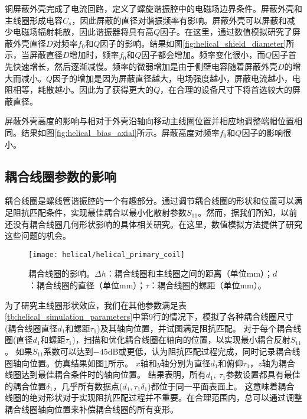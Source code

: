 铜屏蔽外壳完成了电流回路，定义了螺旋谐振腔中的电磁场边界条件。屏蔽外壳和主线圈形成电容$C_s$，因此屏蔽的直径对谐振频率有影响。屏蔽外壳可以屏蔽和减少电磁场辐射耗散，因此谐振器将具有高$Q$因子。在这里，通过数值模拟研究了屏蔽外壳直径$ D $对频率$f_0$和$ Q $因子的影响。结果如图\ref{fig:helical_shield_diameter}所示，当屏蔽直径$ D $增加时，频率$f_0$和$ Q $因子都会增加。频率变化很小，而$ Q $因子首先快速增长，然后逐渐减慢。频率的微弱增加是由于侧壁电容随着屏蔽外壳$D$的增大而减小。$Q$因子的增加是因为屏蔽直径越大，电场强度越小，屏蔽电流越小，电阻相等，耗散越小。因此为了获得更大的$Q$，在合理的设备尺寸下将首选较大的屏蔽直径。

屏蔽外壳高度的影响与相对于外壳沿轴向移动主线圈位置并相应地调整端帽位置相同。结果如图\ref{fig:helical_bias_axial}所示。屏蔽高度对频率$f_0$和$Q$因子的影响很小。

\subsection[耦合线圈参数的影响]{耦合线圈参数的影响}

耦合线圈是螺线管谐振腔的一个有趣部分。通过调节耦合线圈的形状和位置可以满足阻抗匹配条件，实现最佳耦合以最小化散射参数$S_{11}$。然而，据我们所知，以前还没有耦合线圈几何形状影响的具体相关研究。在这里，数值模拟方法提供了研究这些问题的机会。

\begin{figure}
    \centering
    \caption[耦合线圈的影响]{耦合线圈的影响。$\Delta h$：耦合线圈和主线圈之间的距离（单位mm）；$d$：耦合线圈的直径（单位mm）；$\tau$：耦合线圈的螺距（单位mm）。\label{fig:helical_primary_coil}}
    \texttt{[image: helical/helical\_primary\_coil]}
\end{figure}

为了研究主线圈形状效应，我们在其他参数满足表\ref{tb:helical_simulation_parameters}中第9行的情况下，模拟了各种耦合线圈尺寸(耦合线圈直径$d_1$和螺距$\tau_1$)及其轴向位置，并试图满足阻抗匹配。
对于每个耦合线圈(直径$d_1$和螺距$\tau_1$)，扫描和优化耦合线圈在轴向的位置，以实现最小耦合反射$S_{11}$。
如果$S_{11}$系数可以达到$-45$dB或更低，认为阻抗匹配过程完成，同时记录耦合线圈轴向位置。仿真结果如图\ref{fig:helical_primary_coil}所示。
$x$轴和$y$轴分别为直径$d_1$和俯仰$\tau_1$，$z$轴为耦合线圈达到最佳耦合条件时的轴向位置。
结果表明，所有$ d_1,\ \tau_1 $参数设置都具有最佳的耦合位置$ \delta_1$，几乎所有数据点($d_1,\tau_1\delta_1$)都位于同一平面表面上。
这意味着耦合线圈的绝对形状对于实现阻抗匹配过程并不重要。在合理范围内，总可以通过调整耦合线圈轴向位置来补偿耦合线圈的所有变形。

